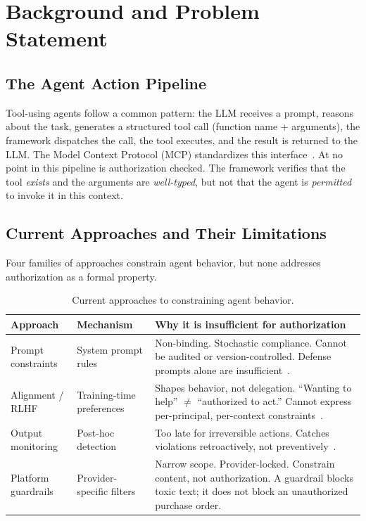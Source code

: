 \documentclass[11pt,a4paper]{article}
\begin{document}
\section{Background and Problem Statement}
\label{sec:background}

\subsection{The Agent Action Pipeline}

Tool-using agents follow a common pattern: the LLM receives a prompt, reasons about the task, generates a structured tool call (function name + arguments), the framework dispatches the call, the tool executes, and the result is returned to the LLM. The Model Context Protocol (MCP) standardizes this interface~\citep{anthropic2024mcp, mcpspec2025}. At no point in this pipeline is authorization checked. The framework verifies that the tool \emph{exists} and the arguments are \emph{well-typed}, but not that the agent is \emph{permitted} to invoke it in this context.

\subsection{Current Approaches and Their Limitations}

Four families of approaches constrain agent behavior, but none addresses authorization as a formal property.

\begin{table}[!ht]
\centering
\caption{Current approaches to constraining agent behavior.}
\label{tab:approaches}
\small
\begin{tabularx}{\textwidth}{@{}l l X@{}}
\toprule
\textbf{Approach} & \textbf{Mechanism} & \textbf{Why it is insufficient for authorization} \\
\midrule
Prompt constraints & System prompt rules & Non-binding. Stochastic compliance. Cannot be audited or version-controlled. Defense prompts alone are insufficient~\citep{zhang2024agentsafetybench}. \\
Alignment / RLHF & Training-time preferences & Shapes behavior, not delegation. ``Wanting to help'' $\neq$ ``authorized to act.'' Cannot express per-principal, per-context constraints~\citep{pierucci2026institutionalai}. \\
Output monitoring & Post-hoc detection & Too late for irreversible actions. Catches violations retroactively, not preventively~\citep{wang2025agentspec, chen2025shieldagent}. \\
Platform guardrails & Provider-specific filters & Narrow scope. Provider-locked. Constrain content, not authorization. A guardrail blocks toxic text; it does not block an unauthorized purchase order. \\
\bottomrule
\end{tabularx}
\end{table}
\end{document}
